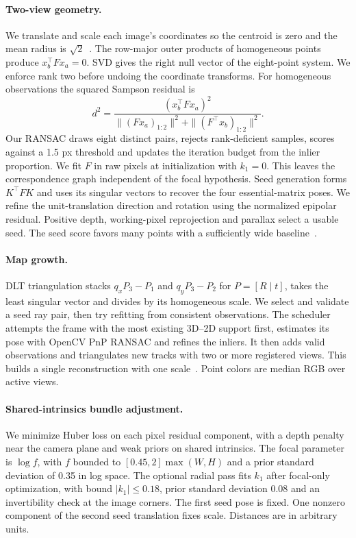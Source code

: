 \documentclass[11pt,a4paper]{article}
\begin{document}
\paragraph{Two-view geometry.}
We translate and scale each image's coordinates so the centroid is zero
and the mean radius is \(\sqrt{2}\)~\cite{hartley1997eightpoint}. The
row-major outer products of homogeneous points produce
\(x_b^\top F x_a=0\). SVD gives the right null vector of the eight-point
system. We enforce rank two before undoing the coordinate transforms.
For homogeneous observations the squared Sampson residual is
\[
 d^2 =
 \frac{(x_b^\top F x_a)^2}
 {\|(Fx_a)_{1:2}\|^2+\|(F^\top x_b)_{1:2}\|^2}.
\]
Our RANSAC draws eight distinct pairs, rejects rank-deficient samples,
scores against a 1.5 px threshold and updates the iteration budget from
the inlier proportion. We fit \(F\) in raw pixels at initialization with
\(k_1=0\). This leaves the correspondence graph independent of the focal
hypothesis. Seed generation forms \(K^\top F K\) and uses its singular
vectors to recover the four essential-matrix poses. We refine the
unit-translation direction and rotation using the normalized epipolar
residual. Positive depth, working-pixel reprojection and parallax select a
usable seed. The seed score favors many points with a sufficiently wide
baseline~\cite{hartley2004mvg}.

\paragraph{Map growth.}
DLT triangulation stacks \(q_xP_3-P_1\) and \(q_yP_3-P_2\) for
\(P=[R\mid t]\), takes the least singular vector and divides by its
homogeneous scale. We select and validate a seed ray pair, then try
refitting from consistent observations. The scheduler attempts the frame
with the most existing 3D--2D support first, estimates its pose with
OpenCV PnP RANSAC and refines the inliers. It then adds valid observations
and triangulates new tracks with two or more registered views. This builds
a single reconstruction with one scale~\cite{schonberger2016sfm}. Point
colors are median RGB over active views.

\paragraph{Shared-intrinsics bundle adjustment.}
We minimize Huber loss on each pixel residual component, with a depth
penalty near the camera plane and weak priors on shared intrinsics. The
focal parameter is \(\log f\), with \(f\) bounded to
\([0.45,2]\max(W,H)\) and a prior standard deviation of 0.35 in log
space. The optional radial pass fits \(k_1\) after focal-only optimization,
with bound \(|k_1|\le0.18\), prior standard deviation 0.08 and an
invertibility check at the image corners. The first seed pose is fixed.
One nonzero component of the second seed translation fixes scale.
Distances are in arbitrary units.
\end{document}
